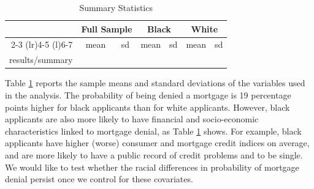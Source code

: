\documentclass[aos]{imsart}
\makeatletter
\numberwithin{equation}{section}
\theoremstyle{plain}
\theoremstyle{remark}
\newcommand\tableinput[1]{\@@input #1 }
\makeatother
\begin{document}
\begin{table}[] \centering
    \caption{Summary Statistics}
    \label{tab:summary}
    \begin{tabular}{rcccccc}
    \toprule
    & \multicolumn{2}{c}{Full Sample} & \multicolumn{2}{c}{Black} & \multicolumn{2}{c}{White} \\
    \cmidrule(r){2-3} \cmidrule(lr){4-5} \cmidrule(l){6-7}
    & mean & sd & mean & sd & mean & sd \\
    \midrule
    \tableinput{results/summary}
    \end{tabular}
\end{table}

Table \ref{tab:summary} reports the sample means and standard deviations of the variables used in the analysis. The probability of being denied a mortgage is 19 percentage points higher for black applicants than for white applicants. However, black applicants are also more likely to have financial and socio-economic characteristics linked to mortgage denial, as Table \ref{tab:summary} shows. For example, black applicants have higher (worse) consumer and mortgage credit indices on average, and are more likely to have a public record of credit problems and to be single. We would like to test whether the racial differences in probability of mortgage denial persist once we control for these covariates.
\end{document}
